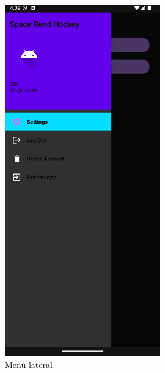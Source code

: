 \documentclass[a4paper,openright,12pt]{article}
\begin{document}
\begin{figure}[htp]
\begin{minipage}{0.3\textwidth}
        \includegraphics[width=0.6\textwidth]{Images/Vista_It4_7.png} 
        \caption{Menú lateral}
        \label{fig:menñu lateral}
    \end{minipage}
    \hfill
    \begin{minipage}{0.3\textwidth}
        \centering

\end{minipage}
\end{figure}
\end{document}
